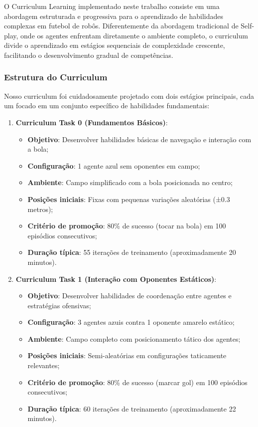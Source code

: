 O Curriculum Learning implementado neste trabalho consiste em uma abordagem estruturada e progressiva para o aprendizado de habilidades complexas em futebol de robôs. Diferentemente da abordagem tradicional de Self-play, onde os agentes enfrentam diretamente o ambiente completo, o curriculum divide o aprendizado em estágios sequenciais de complexidade crescente, facilitando o desenvolvimento gradual de competências.

\subsubsection{Estrutura do Curriculum}

Nosso curriculum foi cuidadosamente projetado com dois estágios principais, cada um focado em um conjunto específico de habilidades fundamentais:

\begin{enumerate}
    \item \textbf{Curriculum Task 0 (Fundamentos Básicos)}: 
    \begin{itemize}
        \item \textbf{Objetivo}: Desenvolver habilidades básicas de navegação e interação com a bola;
        \item \textbf{Configuração}: 1 agente azul sem oponentes em campo;
        \item \textbf{Ambiente}: Campo simplificado com a bola posicionada no centro;
        \item \textbf{Posições iniciais}: Fixas com pequenas variações aleatórias (±0.3 metros);
        \item \textbf{Critério de promoção}: 80\% de sucesso (tocar na bola) em 100 episódios consecutivos;
        \item \textbf{Duração típica}: 55 iterações de treinamento (aproximadamente 20 minutos).
    \end{itemize}
    
    \item \textbf{Curriculum Task 1 (Interação com Oponentes Estáticos)}:
    \begin{itemize}
        \item \textbf{Objetivo}: Desenvolver habilidades de coordenação entre agentes e estratégias ofensivas;
        \item \textbf{Configuração}: 3 agentes azuis contra 1 oponente amarelo estático;
        \item \textbf{Ambiente}: Campo completo com posicionamento tático dos agentes;
        \item \textbf{Posições iniciais}: Semi-aleatórias em configurações taticamente relevantes;
        \item \textbf{Critério de promoção}: 80\% de sucesso (marcar gol) em 100 episódios consecutivos;
        \item \textbf{Duração típica}: 60 iterações de treinamento (aproximadamente 22 minutos).
    \end{itemize}
\end{enumerate}

